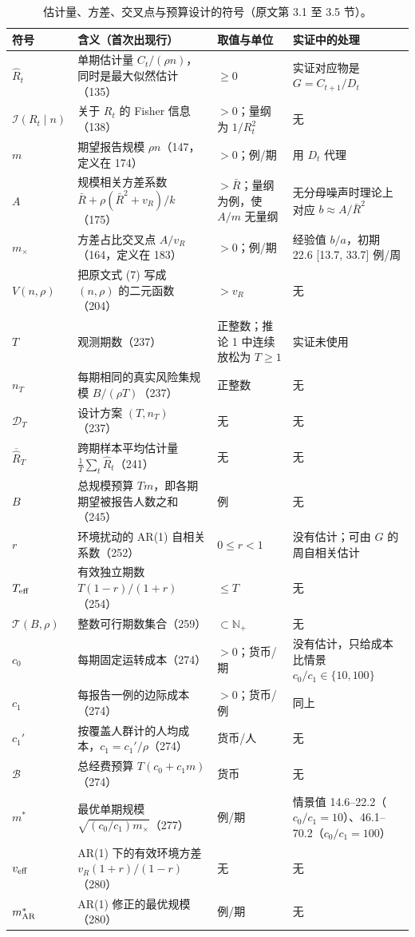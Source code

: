 \begin{table}[!tbp]
\centering
\footnotesize
\caption{估计量、方差、交叉点与预算设计的符号（原文第 3.1 至 3.5 节）。}
\label{tab:sym-design}
\begin{tabular}{L{1.7cm}L{5.8cm}L{3.0cm}L{4.4cm}}
\toprule
符号 & 含义（首次出现行） & 取值与单位 & 实证中的处理 \\
\midrule
$\widehat R_t$ & 单期估计量 $C_t/(\rho n)$，同时是最大似然估计（135） & $\ge0$ & 实证对应物是 $G=C_{t+1}/D_t$ \\
$\mathcal I(R_t\mid n)$ & 关于 $R_t$ 的 Fisher 信息（138） & $>0$；量纲为 $1/R_t^2$ & 无 \\
$m$ & 期望报告规模 $\rho n$（147，定义在 174） & $>0$；例/期 & 用 $D_t$ 代理 \\
$A$ & 规模相关方差系数 $\bar R+\rho(\bar R^2+v_R)/k$（175） & $>\bar R$；量纲为例，使 $A/m$ 无量纲 & 无分母噪声时理论上对应 $b\approx A/\bar R^2$ \\
$m_\times$ & 方差占比交叉点 $A/v_R$（164，定义在 183） & $>0$；例/期 & 经验值 $b/a$，初期 22.6 [13.7, 33.7] 例/周 \\
$V(n,\rho)$ & 把原文式 (7) 写成 $(n,\rho)$ 的二元函数（204） & $>v_R$ & 无 \\
$T$ & 观测期数（237） & 正整数；推论 1 中连续放松为 $T\ge1$ & 实证未使用 \\
$n_T$ & 每期相同的真实风险集规模 $B/(\rho T)$（237） & 正整数 & 无 \\
$\mathcal D_T$ & 设计方案 $(T,n_T)$（237） & 无 & 无 \\
$\overline{\widehat R}_T$ & 跨期样本平均估计量 $\frac1T\sum_t\widehat R_t$（241） & 无 & 无 \\
$B$ & 总规模预算 $Tm$，即各期期望被报告人数之和（245） & 例 & 无 \\
$r$ & 环境扰动的 AR(1) 自相关系数（252） & $0\le r<1$ & 没有估计；可由 $G$ 的周自相关估计 \\
$T_{\rm eff}$ & 有效独立期数 $T(1-r)/(1+r)$（254） & $\le T$ & 无 \\
$\mathcal T(B,\rho)$ & 整数可行期数集合（259） & $\subset\mathbb N_+$ & 无 \\
$c_0$ & 每期固定运转成本（274） & $>0$；货币/期 & 没有估计，只给成本比情景 $c_0/c_1\in\{10,100\}$ \\
$c_1$ & 每报告一例的边际成本（274） & $>0$；货币/例 & 同上 \\
$c_1'$ & 按覆盖人群计的人均成本，$c_1=c_1'/\rho$（274） & 货币/人 & 无 \\
$\mathcal B$ & 总经费预算 $T(c_0+c_1m)$（274） & 货币 & 无 \\
$m^*$ & 最优单期规模 $\sqrt{(c_0/c_1)m_\times}$（277） & 例/期 & 情景值 14.6--22.2（$c_0/c_1=10$）、46.1--70.2（$c_0/c_1=100$） \\
$v_{\rm eff}$ & AR(1) 下的有效环境方差 $v_R(1+r)/(1-r)$（280） & 无 & 无 \\
$m^*_{\rm AR}$ & AR(1) 修正的最优规模（280） & 例/期 & 无 \\
\bottomrule
\end{tabular}
\end{table}


